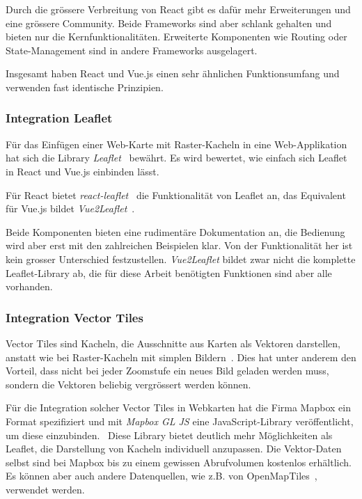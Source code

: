 Durch die grössere Verbreitung von React gibt es dafür mehr Erweiterungen und eine grössere Community.
Beide Frameworks sind aber schlank gehalten und bieten nur die Kernfunktionalitäten.
Erweiterte Komponenten wie Routing oder State-Management sind in andere Frameworks ausgelagert.

Insgesamt haben React und Vue.js einen sehr ähnlichen Funktionsumfang und verwenden fast identische Prinzipien.

\subsubsection{Integration Leaflet}
\label{Analyse Framework:Integration Leaflet}

Für das Einfügen einer Web-Karte mit Raster-Kacheln in eine Web-Applikation hat sich die Library \emph{Leaflet}~\cite{leaflet} bewährt.
Es wird bewertet, wie einfach sich Leaflet in React und Vue.js einbinden lässt.

Für React bietet \emph{react-leaflet}~\cite{react-leaflet} die Funktionalität von Leaflet an, das Equivalent für Vue.js bildet \emph{Vue2Leaflet}~\cite{vue2leaflet}.

Beide Komponenten bieten eine rudimentäre Dokumentation an, die Bedienung wird aber erst mit den zahlreichen Beispielen klar.
Von der Funktionalität her ist kein grosser Unterschied festzustellen.
\emph{Vue2Leaflet} bildet zwar nicht die komplette Leaflet-Library ab, die für diese Arbeit benötigten Funktionen sind aber alle vorhanden.


\subsubsection{Integration Vector Tiles}
\label{Analyse Framework:Integration Vector Tiles}

Vector Tiles sind Kacheln, die Ausschnitte aus Karten als Vektoren darstellen, anstatt wie bei Raster-Kacheln mit simplen Bildern~\cite{geometalab_vectortiles}.
Dies hat unter anderem den Vorteil, dass nicht bei jeder Zoomstufe ein neues Bild geladen werden muss, sondern die Vektoren beliebig vergrössert werden können.

Für die Integration solcher Vector Tiles in Webkarten hat die Firma Mapbox ein Format spezifiziert und mit \emph{Mapbox GL JS} eine JavaScript-Library veröffentlicht, um diese einzubinden.~\cite{mapbox_gl_js}
Diese Library bietet deutlich mehr Möglichkeiten als Leaflet, die Darstellung von Kacheln individuell anzupassen.
Die Vektor-Daten selbst sind bei Mapbox bis zu einem gewissen Abrufvolumen kostenlos erhältlich.
Es können aber auch andere Datenquellen, wie z.B. von OpenMapTiles~\cite{openmaptiles}, verwendet werden.


